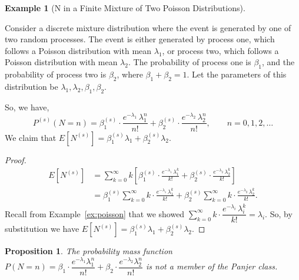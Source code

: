 \documentclass[11pt]{amsart}
\theoremstyle{definition}
\newtheorem{example}{Example}
\theoremstyle{plain}
\newtheorem{proposition}{Proposition}
\begin{document}
\begin{example}[N in a Finite Mixture of Two Poisson Distributions]\label{ex:poisson-mix}
Consider a discrete mixture distribution where the event is generated by one of two random
processes.  The event is either generated by process one, which follows a Poisson
distribution with mean $\lambda_1$, or process two, which follows a Poisson distribution
with mean $\lambda_2$.  The probability of process one is $\beta_1$, and the probability of
process two is $\beta_2$, where $\beta_1 + \beta_2 = 1$.  Let the parameters of this
distribution be $\lambda_1, \lambda_2, \beta_1, \beta_2$.

So, we have,
\[
    P^{(s)}(N = n)
    = \beta_1^{(s)} \cdot \frac{e^{-\lambda_1}\,\lambda_1^n}{n!}
    + \beta_2^{(s)} \cdot \frac{e^{-\lambda_2}\,\lambda_2^n}{n!},
    \qquad n = 0, 1, 2, \ldots
\]
We claim that $E[N^{(s)}] = \beta_1^{(s)}\lambda_1 + \beta_2^{(s)}\lambda_2$.

\begin{proof}
\begin{align*}
E[N^{(s)}]
    &= \sum_{k=0}^{\infty} k \left[\beta_1^{(s)} \cdot
       \frac{e^{-\lambda_1}\,\lambda_1^k}{k!}
       + \beta_2^{(s)} \cdot \frac{e^{-\lambda_2}\,\lambda_2^k}{k!}\right] \\
    &= \beta_1^{(s)} \sum_{k=0}^{\infty} k \cdot \frac{e^{-\lambda_1}\,\lambda_1^k}{k!}
     + \beta_2^{(s)} \sum_{k=0}^{\infty} k \cdot \frac{e^{-\lambda_2}\,\lambda_2^k}{k!}.
\end{align*}
Recall from Example~\ref{ex:poisson} that we showed
$\sum_{k=0}^{\infty} k \cdot \dfrac{e^{-\lambda_i}\,\lambda_i^k}{k!} = \lambda_i$.
So, by substitution we have $E[N^{(s)}] = \beta_1^{(s)}\lambda_1 + \beta_2^{(s)}\lambda_2$.
\qedhere
\end{proof}

\begin{proposition}\label{prop:not-panjer}
The probability mass function
$P(N = n) = \beta_1 \cdot \dfrac{e^{-\lambda_1}\lambda_1^n}{n!}
           + \beta_2 \cdot \dfrac{e^{-\lambda_2}\lambda_2^n}{n!}$
is not a member of the Panjer class.
\end{proposition}


\end{example}
\end{document}
